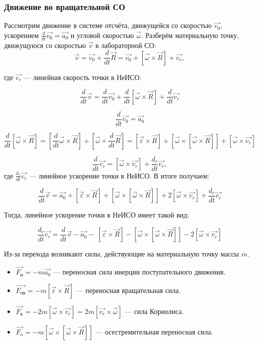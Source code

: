 \documentclass[12pt, a4paper]{article}%
\begin{document}
\subsubsection*{Движение во вращательной СО}
Рассмотрим движение в системе отсчёта, движущейся со скоростью $\vec{v_0}$, ускорением $\frac{d}{dt} \vec{v_0} = \vec{a_0}$ и угловой скоростью $\vec{\omega}$. Разберём материальную точку, движущуюся со скоростью $\vec{v}$ в лабораторной СО: 
\[\vec{v} = \vec{v_0}+ \frac{d}{dt}\vec{R} = \vec{v_0}+ [\vec{\omega} \times\vec{R}]+\vec{v_r},\]

где $\vec{v_r}$ --- линейная скорость точки в НеИСО. 

\[
\frac{d}{dt}\vec{v} = \frac{d}{dt}\vec{v_0}+ \frac{d}{dt}[\vec{\omega} \times\vec{R}]+\frac{d}{dt}\vec{v_r}
\]

\[
\frac{d}{dt}\vec{v_0} = \vec{a_0}
\]

\[
\frac{d}{dt}[\vec{\omega} \times\vec{R}] = [\frac{d}{dt}\vec{\omega} \times\vec{R}] + [\vec{\omega} \times\frac{d}{dt}\vec{R}] = [\vec{\varepsilon} \times\vec{R}] + [\vec{\omega} \times[\vec{\omega} \times\vec{R}]] + [\vec{\omega} \times\vec{v_r}]
\]

\[
\frac{d}{dt} \vec{v_r} = [\vec{\omega} \times\vec{v_r}] + \frac{d_r}{dt}\vec{v_r},
\]
где $\frac{d_r}{dt}\vec{v_r}$ --- линейное ускорение точки в НеИСО. В итоге получаем: 

\[
\frac{d}{dt} \vec{v} = \vec{a_0} + [\vec{\varepsilon} \times\vec{R}] + [\vec{\omega} \times[\vec{\omega} \times\vec{R}]] + 2[\vec{\omega} \times\vec{v_r}]+\frac{d_r}{dt}\vec{v_r}
\]

Тогда, линейное ускорение точки в НеИСО имеет такой вид:

\[
\frac{d_r}{dt}\vec{v_r} = \frac{d}{dt} \vec{v} - \vec{a_0} -\ [\vec{\varepsilon} \times\vec{R}] - [\vec{\omega} \times[\vec{\omega} \times\vec{R}]] - 2[\vec{\omega} \times\vec{v_r}]
\]

Из-за перехода возникают силы, действующие на материальную точку массы $m$. 

\begin{itemize}
    \item $\vec{F_{\text{и}}} = -m\vec{a_0}$ --- переносная сила инерции поступательного движения.
    \item $\vec{F_{\text{пв}}} = -m[\vec{\varepsilon} \times\vec{R}]$ --- переносная вращательная сила.
    \item $\vec{F_\text{к}} = -2m[\vec{\omega} \times\vec{v_r}] = 2m[\vec{v_r}\times\vec{\omega} ]$ --- сила Кориолиса.
    \item $\vec{F_{o}} = -m[\vec{\omega} \times[\vec{\omega} \times\vec{R}]]$ --- осестремительная переносная сила.
\end{itemize}
\end{document}
